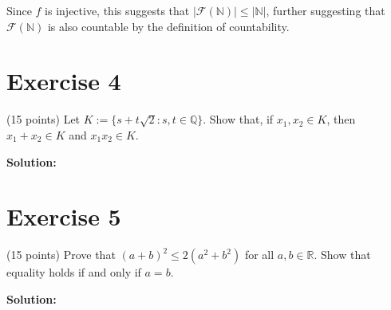 \documentclass{article}
\begin{document}
Since $f$ is injective, this suggests that $|\mathcal{F}(\mathbb{N})| \leq |\mathbb{N}|$, further suggesting that $\mathcal{F}(\mathbb{N})$ is also countable by the definition of countability.

\newpage

\section*{Exercise 4}
(15 points) Let $K := \{s + t\sqrt{2} : s,t \in \mathbb{Q}\}$. Show that, if $x_1, x_2 \in K$, then $x_1 + x_2 \in K$ and $x_1x_2 \in K$.

\textbf{Solution:}

\newpage

\section*{Exercise 5}
(15 points) Prove that $(a + b)^2 \leq 2(a^2 + b^2)$ for all $a,b \in \mathbb{R}$. Show that equality holds if and only if $a = b$.

\textbf{Solution:}
\end{document}
